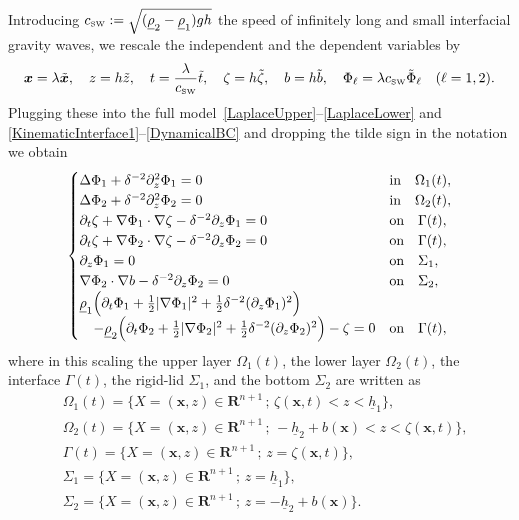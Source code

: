\documentclass[11pt,leqno]{article}
\numberwithin{equation}{section}
\numberwithin{figure}{section}
\begin{document}
Introducing $c_{\mbox{\rm\tiny SW}} :=\sqrt{ (\underline{\rho}_2-\underline{\rho}_1)gh }$
the speed of infinitely long and small interfacial gravity waves, we rescale the independent and the dependent variables by 
\[
\bm{x} = \lambda\tilde{\bm{x}}, \quad z = h\tilde{z}, \quad t = \frac{\lambda}{c_{\mbox{\rm\tiny SW}}}\tilde{t}, \quad
 \zeta = h\tilde{\zeta}, \quad b = h\tilde{b}, \quad  \Phi_\ell = \lambda c_{\mbox{\rm\tiny SW}}\tilde{\Phi}_\ell
 \quad (\ell=1,2).
\]
%
Plugging these into the full model~\eqref{LaplaceUpper}--\eqref{LaplaceLower} and 
\eqref{KinematicInterface1}--\eqref{DynamicalBC} and dropping the tilde sign in the notation we obtain 
%
\[
\begin{cases}
\Delta\Phi_1 + \delta^{-2}\partial_z^2\Phi_1 = 0 & \mbox{in}\quad \Omega_1(t), \\
\Delta\Phi_2 + \delta^{-2}\partial_z^2\Phi_2 = 0 & \mbox{in}\quad \Omega_2(t), \\
\partial_t\zeta + \nabla\Phi_1 \cdot \nabla\zeta - \delta^{-2}\partial_z\Phi_1 = 0
 & \mbox{on}\quad \Gamma(t), \\
\partial_t\zeta + \nabla\Phi_2 \cdot \nabla\zeta - \delta^{-2}\partial_z\Phi_2 = 0
 & \mbox{on}\quad \Gamma(t), \\
\partial_z\Phi_1 = 0 & \mbox{on}\quad \Sigma_1, \\
\nabla\Phi_2 \cdot \nabla b - \delta^{-2}\partial_z\Phi_2 = 0
 & \mbox{on}\quad \Sigma_2, \\
\underline{\rho}_1\Bigl( \partial_t\Phi_1 + \frac12|\nabla\Phi_1|^2 + \frac12\delta^{-2}(\partial_z\Phi_1)^2 \Bigr) \\
\quad
 - \underline{\rho}_2\Bigl( \partial_t\Phi_2 + \frac12|\nabla\Phi_2|^2 + \frac12\delta^{-2}(\partial_z\Phi_2)^2 \Bigr)
 - \zeta = 0
 & \mbox{on}\quad \Gamma(t),
\end{cases}
\]
%
where in this scaling the upper layer $\Omega_1(t)$, the lower layer $\Omega_2(t)$, the interface $\Gamma(t)$, 
the rigid-lid $\Sigma_1$, and the bottom $\Sigma_2$ are written as 
%
\begin{align*}
& \Omega_1(t) = \{ X=(\bm{x},z)\in\mathbf{R}^{n+1} \,;\, \zeta(\bm{x},t) < z < \underline{h}_1 \}, \\
& \Omega_2(t) = \{ X=(\bm{x},z)\in\mathbf{R}^{n+1} \,;\, -\underline{h}_2+b(\bm{x}) < z < \zeta(\bm{x},t) \}, \\
& \Gamma(t) = \{ X=(\bm{x},z)\in\mathbf{R}^{n+1} \,;\, z = \zeta(\bm{x},t) \}, \\
& \Sigma_1 = \{ X=(\bm{x},z)\in\mathbf{R}^{n+1} \,;\, z = \underline{h}_1 \}, \\
& \Sigma_2 = \{ X=(\bm{x},z)\in\mathbf{R}^{n+1} \,;\,  z = -\underline{h}_2+b(\bm{x}) \}.
\end{align*}
\end{document}
